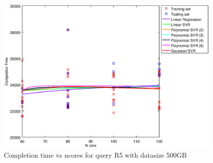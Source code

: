 
\begin {figure}[hbtp]
\centering
\includegraphics[width=\textwidth]{output/R5_500_ONLY_1_OVER_NCORES/plot_R5_500.eps}
\caption{Completion time vs ncores for query R5 with datasize 500GB}
\label{fig:all_nonlinear_R5_500}
\end {figure}
